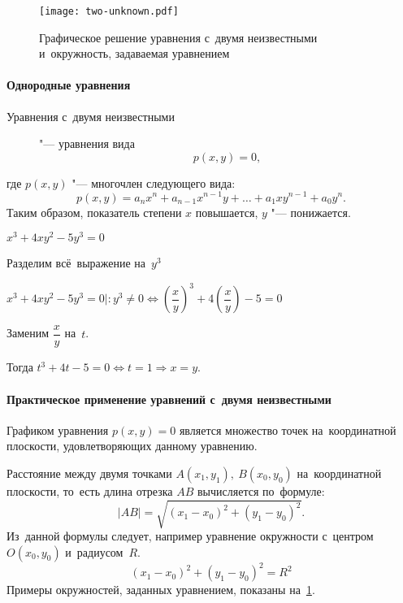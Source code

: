 \documentclass[]{scrartcl}
\begin{document}
\begin{figure}[ht]
	\centering %
	\texttt{[image: two-unknown.pdf]}
	\caption{Графическое решение уравнения с~двумя неизвестными и~окружность, задаваемая уравнением}\label{fig:two-unknown}
\end{figure}

\paragraph{Однородные уравнения}
\begin{description}
	\item[Уравнения с~двумя неизвестными] "--- уравнения вида
	\begin{equation}\label{eq:two-unknown-3}
	p(x,y)=0,
	\end{equation}
\end{description}
где ${\textstyle p(x,y)}$ "--- многочлен следующего вида:
\begin{equation}\label{eq:two-unknown-4}
p(x,y)=a_{n}x^{n}+a_{n-1}x^{n-1}y+\ldots+a_{1}xy^{n-1}+a_{0}y^{n}.
\end{equation}
Таким образом, показатель степени ${\textstyle x}$ повышается, ${\textstyle y}$ "--- понижается.

\begin{Thexmpl}\label{ex:two-unknown-2}
	${\textstyle x^3+4xy^2-5y^3=0}$
	
	Разделим всё~выражение на~${\textstyle y^3}$
	
	${\textstyle x^3+4xy^2-5y^3=0|:y^3\neq 0 \Leftrightarrow  (\dfrac{x}{y})^3+4(\dfrac{x}{y})-5=0}$
	
	Заменим ${\textstyle \dfrac{x}{y}}$ на~${\textstyle t}$.
	
	Тогда ${\textstyle t^3+4t-5=0 \Leftrightarrow t=1 \Rightarrow x=y}$. 	
\end{Thexmpl}



\paragraph{Практическое применение уравнений с~двумя неизвестными}\label{two-unknown-practice}
Графиком уравнения ${\textstyle p(x,y)=0}$ является множество точек на~координатной плоскости, удовлетворяющих данному уравнению.

Расстояние между двумя точками ${\textstyle A(x_{1},y_{1}),\ B(x_{0},y_{0})}$ на~координатной плоскости, то~есть длина отрезка ${\textstyle AB}$ вычисляется по~формуле:
\begin{equation}\label{eq:dist-between-points}
|AB|=\sqrt{(x_{1}-x_{0})^2+(y_{1}-y_{0})^2}.
\end{equation}
Из~данной формулы следует, например уравнение окружности с~центром ${\textstyle O(x_{0},y_{0})}$ и~радиусом~${\textstyle R}$.
\begin{equation}\label{eq:circle-equation}
(x_{1}-x_{0})^{2}+(y_{1}-y_{0})^2=R^2
\end{equation}
Примеры окружностей, заданных уравнением, показаны на~\ref{fig:two-unknown}.
\end{document}
